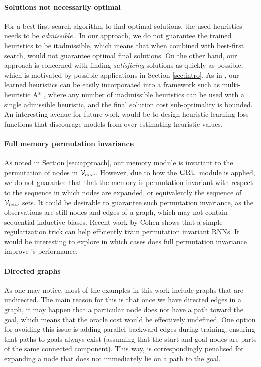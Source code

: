 \paragraph{Solutions not necessarily optimal} For a best-first search algorithm to find optimal solutions, the used heuristics needs to be \textit{admissible} \cite{russell2002artificial}. In our approach, we do not guarantee the trained heuristics to be \text it{admissible}, which means that when combined with best-first search, \phil would not guarantee optimal final solutions. On the other hand, our approach is concerned with finding \textit{satisficing} solutions as quickly as possible, which is motivated by possible applications in Section \ref{sec:intro}. As in \cite{bhardwaj2017learning}, our learned heuristics can be easily incorporated into a framework such as multi-heuristic A* \cite{aine2016multi}, where any number of inadmissible heuristics can be used with a single admissible heuristic, and the final solution cost sub-optimality is bounded.  An interesting avenue for future work would be to design heuristic learning loss functions that discourage models from over-estimating heuristic values.

\paragraph{Full memory permutation invariance} As noted in Section \ref{sec:approach}, our memory module is invariant to the permutation of nodes in $\mathcal{V}_{new}$. However, due to how the $\textsc{GRU}$ module is applied, we do not guarantee that that the memory is permutation invariant with respect to the sequence in which nodes are expanded, or equivalently the sequence of $\mathcal{V}_{new}$ sets. It could be desirable to guarantee such permutation invariance, as the observations are still nodes and edges of a graph, which may not contain sequential inductive biases. Recent work by Cohen \etal \cite{cohen2020regularizing} shows that a simple regularization trick can help efficiently train permutation invariant RNNs. It would be interesting to explore in which cases does full permutation invariance improve \phil's performance.  


\paragraph{Directed graphs} As one may notice, most of the examples in this work include graphs that are undirected. The main reason for this is that once we have directed edges in a graph, it may happen that a particular node does not have a path toward the goal, which means that the oracle cost would be effectively undefined. One option for avoiding this issue is adding parallel backward edges during training, ensuring that paths to goals always exist (assuming that the start and goal nodes are parts of the same connected component). This way, \phil is correspondingly penalised for expanding a node that does not immediately lie on a path to the goal.

